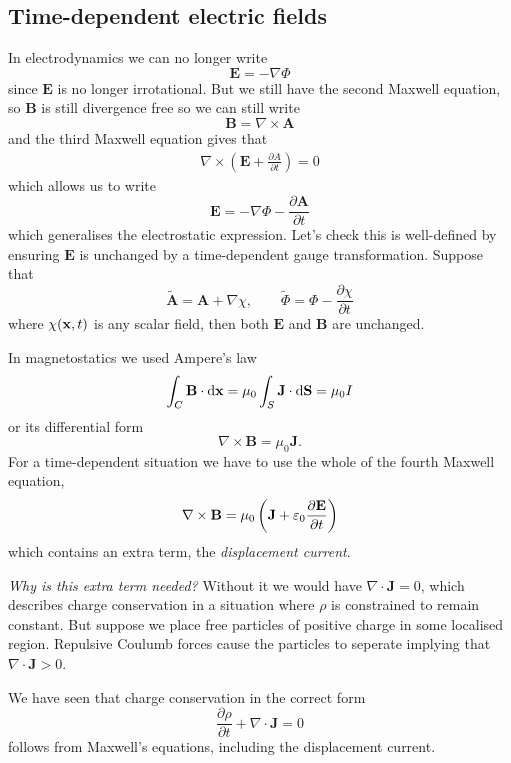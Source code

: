 \documentclass{article}
\begin{document}
\subsection{Time-dependent electric fields}
In electrodynamics we can no longer write
\[
  \mathbf E = -\nabla \Phi
\]
since $ \mathbf E $ is no longer irrotational. But we still have the second Maxwell equation, so $ \mathbf B $ is still divergence free so we can still write
\[
  \mathbf B = \nabla\times\mathbf A
\]
and the third Maxwell equation gives that
\begin{align*}
	\nabla\times\left(\mathbf E +\frac{\partial A}{\partial t}\right) = 0
\end{align*}
which allows us to write
\[
	\mathbf E = - \nabla\Phi - \frac{\partial \mathbf A}{\partial t}
\]
which generalises the electrostatic expression. Let's check this is well-defined by ensuring $ \mathbf E $ is unchanged by a time-dependent gauge transformation. Suppose that
\[
	\tilde {\mathbf A } = \mathbf A + \nabla \chi,\qquad \tilde\Phi = \Phi - \frac{\partial \chi}{\partial t}
\]
where $ \chi(\mathbf{x},t) $ is any scalar field, then both $ \mathbf E $ and $ \mathbf B $ are unchanged.\par
In magnetostatics we used Ampere's law 
\[
  \int_C \mathbf B \cdot\mathrm d\mathbf{x} = \mu_0 \int_S \mathbf J\cdot\mathrm d \mathbf S = \mu_0 I
\]
or its differential form
\[
  \nabla \times\mathbf B = \mu_0 \mathbf J.
\]
For a time-dependent situation we have to use the whole of the fourth Maxwell equation,
\[
	\nabla\times\mathbf B = \mu_0 \left(\mathbf J +\varepsilon_0 \frac{\partial \mathbf E}{\partial t}\right)
\]
which contains an extra term, the \textit{displacement current}.\par
\textit{Why is this extra term needed?} Without it we would have $ \nabla\cdot\mathbf J = 0 $, which describes charge conservation in a situation where $ \rho $ is constrained to remain constant. But suppose we place free particles of positive charge in some localised region. Repulsive Coulumb forces cause the particles to seperate implying that $ \nabla\cdot\mathbf J > 0 $.\par
We have seen that charge conservation in the correct form
\[
	\frac{\partial \rho}{\partial t} + \nabla\cdot \mathbf J =0 
\]
follows from Maxwell's equations, including the displacement current.
\end{document}

